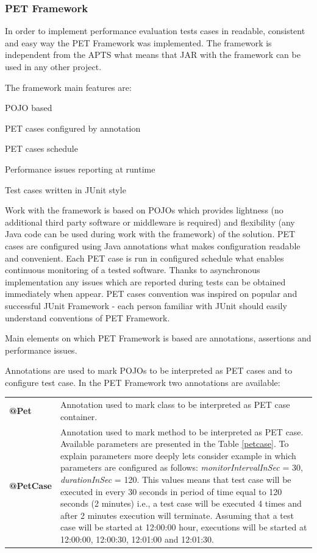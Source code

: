 \documentclass[12pt,a4paper]{article}
\let\tempone\itemize
\let\temptwo\enditemize
\renewenvironment{itemize}{\tempone\addtolength{\itemsep}{-0.4\baselineskip}}{\temptwo}
\begin{document}
\subsubsection{PET Framework} \label{framework}
 
In order to implement performance evaluation tests cases in readable, consistent and easy way the PET Framework was implemented. The framework is independent from the APTS what means that JAR with the framework can be used in any other project. 

The framework main features are:
\begin{itemize}
\item POJO based
\item PET cases configured by annotation
\item PET cases schedule
\item Performance issues reporting at runtime 
\item Test cases written in JUnit \cite{junit} style
\end{itemize}

Work with the framework is based on POJOs which provides lightness (no additional third party software or middleware is required) and flexibility (any Java code can be used during work with the framework) of the solution. PET cases are  configured using Java annotations what makes configuration readable and convenient. Each PET case is run in configured schedule what enables continuous monitoring of a tested software. Thanks to asynchronous implementation any issues which are reported during tests can be obtained immediately when appear. PET cases convention was inspired on popular and successful JUnit Framework - each person familiar with JUnit should easily understand conventions of PET Framework.       

Main elements on which PET Framework is based are annotations, assertions and performance issues. 

Annotations are used to mark POJOs to be interpreted as PET cases and to configure test case. In the PET Framework two annotations are available:

\begin{table}[!htb]
\def\arraystretch{1.5}
\begin{tabularx}{\textwidth}{p{1.4cm}X}
\textbf{@Pet} 	  & Annotation used to mark class to be interpreted as PET case container. \\ 
\textbf{@PetCase} & Annotation used to mark method to be interpreted as PET case. Available parameters are presented in the Table \ref{petcase}. To explain parameters more deeply lets consider example in which parameters are configured as follows: \textit{monitorIntervalInSec} = 30, \textit{durationInSec} = 120. This values means that test case will be executed in every 30 seconds in period of time equal to 120 seconds (2 minutes) i.e., a test case will be executed 4 times and after 2 minutes execution will terminate. Assuming that a test case will be started at 12:00:00 hour, executions will be started at 12:00:00, 12:00:30, 12:01:00 and 12:01:30. 
\end{tabularx}
\end{table}
\end{document}
